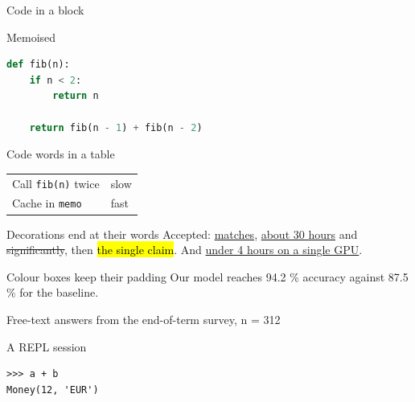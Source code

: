 \documentclass{beamer}
\begin{document}
\begin{frame}[fragile]{Code in a block}
\begin{block}{Memoised}
\begin{lstlisting}[frame=none,language=Python]
def fib(n):
    if n < 2:
        return n

    return fib(n - 1) + fib(n - 2)
\end{lstlisting}
\end{block}
\end{frame}

\begin{frame}{Code words in a table}
\begin{tabular}{ll}
\hline
Call \texttt{fib(n)} twice & slow \\
Cache in \texttt{memo} & fast \\
\hline
\end{tabular}
\end{frame}

\begin{frame}{Decorations end at their words}
Accepted: \uline{matches}, \uline{about 30 hours} and \sout{significantly}, then
\hl{the single claim}. And \uline{under 4 hours on a single GPU}.
\end{frame}

\begin{frame}{Colour boxes keep their padding}
Our model reaches \colorbox{green!25}{94.2 \%} accuracy against 87.5 \% for the baseline.

\vspace{1em}
\centering\colorbox{black!8}{\small Free-text answers from the end-of-term survey, n = 312}
\end{frame}

\begin{frame}[fragile]{A REPL session}
\begin{lstlisting}[frame=none]
>>> a + b
Money(12, 'EUR')
\end{lstlisting}
\end{frame}
\end{document}
